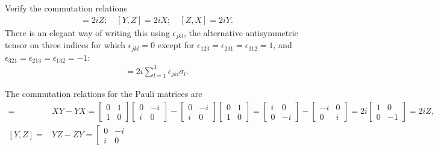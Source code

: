 \documentclass[en]{sol-man}
\begin{document}
\begin{exe}
    Verify the commutation relations
    \begin{align}
        [X,Y]=2iZ;\quad[Y,Z]=2iX;\quad[Z,X]=2iY.
    \end{align}
    There is an elegant way of writing this using $\epsilon_{jkl}$, the alternative antisymmetric tensor on three indices for which $\epsilon_{jkl}=0$ except for $\epsilon_{123}=\epsilon_{231}=\epsilon_{312}=1$, and $\epsilon_{321}=\epsilon_{213}=\epsilon_{132}=-1$:
    \begin{align}
        [\sigma_j,\sigma_k]=2i\sum_{l=1}^3\epsilon_{jkl}\sigma_l.
    \end{align}
\end{exe}
\begin{pf}
    The commutation relations for the Pauli matrices are
    \begin{align}
        [X,Y]=&XY-YX=\left[\begin{matrix}
            0&1\\
            1&0
        \end{matrix}\right]\left[\begin{matrix}
            0&-i\\
            i&0
        \end{matrix}\right]-\left[\begin{matrix}
            0&-i\\
            i&0
        \end{matrix}\right]\left[\begin{matrix}
            0&1\\
            1&0
        \end{matrix}\right]=\left[\begin{matrix}
            i&0\\
            0&-i
        \end{matrix}\right]-\left[\begin{matrix}
            -i&0\\
            0&i
        \end{matrix}\right]=2i\left[\begin{matrix}
            1&0\\
            0&-1
        \end{matrix}\right]=2iZ,\\
        [Y,Z]=&YZ-ZY=\left[\begin{matrix}
            0&-i\\
            i&0

\end{matrix}
\end{align}
\end{pf}
\end{document}
